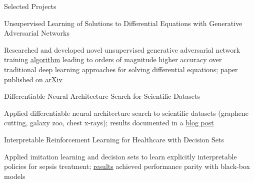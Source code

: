 \documentclass{resume} %
\begin{document}

\begin{rSection}{Selected Projects}

\begin{rSubsection}{Unsupervised Learning of Solutions to Differential Equations with Generative Adversarial Networks}{}{}{}
	\item Researched and developed novel unsupervised generative adversarial network training \href{https://dylanrandle.github.io/denn/deqgan.html}{algorithm} leading to orders of magnitude higher accuracy over traditional deep learning approaches for solving differential equations; paper published on \href{https://arxiv.org/abs/2007.11133}{arXiv}
\end{rSubsection}
\begin{rSubsection}{Differentiable Neural Architecture Search for Scientific Datasets}{}{}{}
	\item Applied differentiable neural architecture search to scientific datasets (graphene cutting, galaxy zoo, chest x-rays); results documented in a \href{https://towardsdatascience.com/investigating-differentiable-neural-architecture-search-for-scientific-datasets-62899be8714e}{blog post}
\end{rSubsection}
\begin{rSubsection}{Interpretable Reinforcement Learning for Healthcare with Decision Sets}{}{}{}
	\item Applied imitation learning and decision sets to learn explicitly interpretable policies for sepsis treatment; \href{https://dylanrandle.github.io/irl/irl.html}{results} achieved performance parity with black-box models
\end{rSubsection}

\end{rSection}
\end{document}

